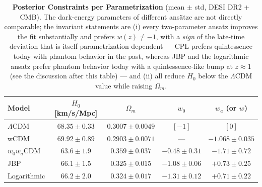 \documentclass[11pt,letterpaper]{article}
\begin{document}
\begin{table}[!htbp]
    \centering
    \caption{\textbf{Posterior Constraints per Parametrization} (mean $\pm$ std, DESI DR2 + CMB). The dark-energy parameters of different ans\"atze are not directly comparable; the invariant statements are (i) every two-parameter ansatz improves the fit substantially and prefers $w(z) \neq -1$, with a \emph{sign} of the late-time deviation that is itself parametrization-dependent --- CPL prefers quintessence today with phantom behavior in the past, whereas JBP and the logarithmic ansatz prefer phantom behavior today with a quintessence-like bump at $z \approx 1$ (see the discussion after this table) --- and (ii) all reduce $H_0$ below the $\Lambda$CDM value while raising $\Omega_m$.}
    \label{tab:robustness}
    \begin{tabular}{lcccc}
        \toprule
        Model & $H_0$ [km/s/Mpc] & $\Omega_m$ & $w_0$ & $w_a$ (or $w$) \\
        \midrule
        $\Lambda$CDM & $68.35 \pm 0.33$ & $0.3007 \pm 0.0049$ & $[-1]$ & $[0]$ \\
        wCDM & $69.92 \pm 0.89$ & $0.2903 \pm 0.0071$ & --- & $-1.068 \pm 0.035$ \\
        $w_0 w_a$CDM & $63.6 \pm 1.9$ & $0.359 \pm 0.037$ & $-0.48 \pm 0.31$ & $-1.71 \pm 0.72$ \\
        JBP & $66.1 \pm 1.5$ & $0.325 \pm 0.015$ & $-1.08 \pm 0.06$ & $+0.73 \pm 0.25$ \\
        Logarithmic & $66.2 \pm 2.0$ & $0.324 \pm 0.017$ & $-1.31 \pm 0.12$ & $+0.71 \pm 0.22$ \\
        \bottomrule
    \end{tabular}
\end{table}
\end{document}
